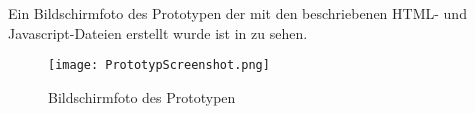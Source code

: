Ein Bildschirmfoto des Prototypen der mit den beschriebenen HTML- und
Javascript-Dateien erstellt wurde ist in  zu
sehen.

\begin{figure}[htb]
\centering
\texttt{[image: PrototypScreenshot.png]}
\caption[Protoyp Bildschirmfoto]{Bildschirmfoto des Prototypen}
\label{fig:PrototypScreenshot}
\end{figure}